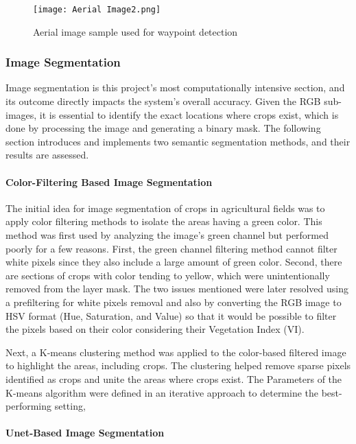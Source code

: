 \documentclass[conference]{IEEEtran}
\begin{document}
	
	\begin{figure}[t]
		\centering
		\texttt{[image: Aerial Image2.png]}
		\caption{Aerial image sample used for waypoint detection
			\cite{b5}}
		\label{fig_Aerial}
	\end{figure}
	
	\subsubsection{Image Segmentation}\label{Image Segmentation}\leavevmode
	
	Image segmentation is this project's most computationally intensive section, and its outcome directly impacts the system's overall accuracy. Given the RGB sub-images, it is essential to identify the exact locations where crops exist, which is done by processing the image and generating a binary mask. The following section introduces and implements two semantic segmentation methods, and their results are assessed.
	
	\paragraph{Color-Filtering Based Image Segmentation}\leavevmode
	
	The initial idea for image segmentation of crops in agricultural fields was to apply color filtering methods to isolate the areas having a green color. This method was first used by analyzing the image's green channel but performed poorly for a few reasons. First, the green channel filtering method cannot filter white pixels since they also include a large amount of green color. Second, there are sections of crops with color tending to yellow, which were unintentionally removed from the layer mask. The two issues mentioned were later resolved using a prefiltering for white pixels removal and also by converting the RGB image to HSV format (Hue, Saturation, and Value) so that it would be possible to filter the pixels based on their color considering their Vegetation Index (VI).
	
	Next, a K-means clustering method was applied to the color-based filtered image to highlight the areas, including crops. The clustering helped remove sparse pixels identified as crops and unite the areas where crops exist. The Parameters of the K-means algorithm were defined in an iterative approach to determine the best-performing setting,
	
	
	\paragraph{Unet-Based Image Segmentation}\leavevmode
	
\end{document}
